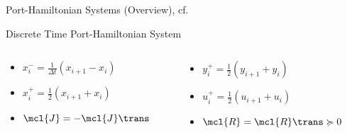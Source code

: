 \begin{frame}{Port-Hamiltonian Systems (Overview), cf.~\cite{Morandin2022}}
    \begin{block}{Discrete Time Port-Hamiltonian System}
    \end{block}

    \begin{columns}
        \begin{column}{.27\textwidth}
            \begin{itemize}
                \item $x_i^- = \frac{1}{\Delta t} (x_{i + 1} - x_i)$
                \item $x_i^+ = \frac{1}{2} (x_{i + 1} + x_i)$
                \item $\mcl{J} = - \mcl{J}\trans$
            \end{itemize}
        \end{column}
        \begin{column}{.27\textwidth}
            \begin{itemize}
                \item $y_i^+ = \frac{1}{2} (y_{i + 1} + y_i)$
                \item $u_i^+ = \frac{1}{2} (u_{i + 1} + u_i)$
                \item $\mcl{R} = \mcl{R}\trans \succcurlyeq 0$
            \end{itemize}
        \end{column}
    \end{columns}
\end{frame}